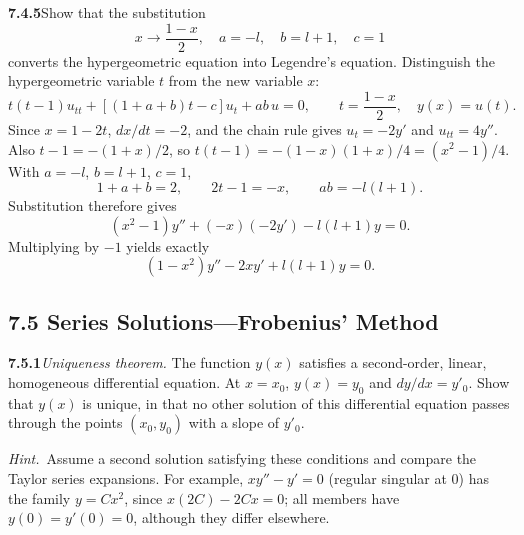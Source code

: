 \par\bigskip
\noindent\textbf{7.4.5}\quad Show that the substitution
\[
x\to\frac{1-x}{2},\quad a=-l,\quad b=l+1,\quad c=1
\]
converts the hypergeometric equation into Legendre's equation.
\solution
Distinguish the hypergeometric variable $t$ from the new variable $x$:
\[
t(t-1)u_{tt}+[(1+a+b)t-c]u_t+ab\,u=0,
\qquad t=\frac{1-x}{2},\quad y(x)=u(t).
\]
Since $x=1-2t$, $dx/dt=-2$, and the chain rule gives $u_t=-2y'$ and
$u_{tt}=4y''$. Also $t-1=-(1+x)/2$, so
$t(t-1)=-(1-x)(1+x)/4=(x^2-1)/4$. With $a=-l$, $b=l+1$, $c=1$,
\[
1+a+b=2,\qquad 2t-1=-x,\qquad ab=-l(l+1).
\]
Substitution therefore gives
\[
(x^2-1)y''+(-x)(-2y')-l(l+1)y=0.
\]
Multiplying by $-1$ yields exactly
\[
\boxed{(1-x^2)y''-2xy'+l(l+1)y=0}.
\]

\subsection*{7.5 Series Solutions---Frobenius' Method}

\par\bigskip
\noindent\textbf{7.5.1}\quad \emph{Uniqueness theorem.} The function $y(x)$
satisfies a second-order, linear, homogeneous differential equation. At
$x=x_{0}$, $y(x)=y_{0}$ and $dy/dx=y'_{0}$. Show that $y(x)$ is unique, in
that no other solution of this differential equation passes through the points
$(x_{0},y_{0})$ with a slope of $y'_{0}$.

\emph{Hint.}~Assume a second solution satisfying these conditions and compare
the Taylor series expansions.
\solution
{}
For example, $xy''-y'=0$ (regular singular at $0$) has the family
$y=Cx^2$, since $x(2C)-2Cx=0$; all members have $y(0)=y'(0)=0$, although
they differ elsewhere.

